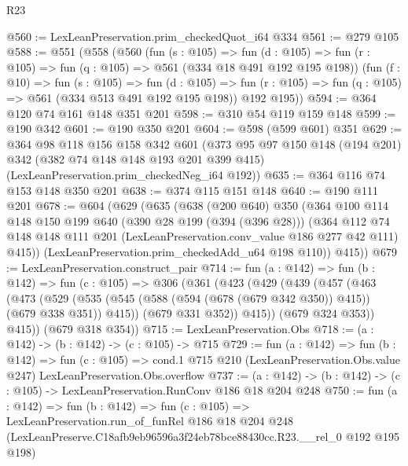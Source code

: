 \begin{lexlean}{R23}
\begin{coremodule}
@560 := LexLeanPreservation.prim_checkedQuot_i64 @334
@561 := @279 @105
@588 := @551
    (@558
      (@560
        (fun (s : @105) =>
        fun (d : @105) => fun (r : @105) => fun (q : @105) => @561 (@334 @18 @491 @192 @195 @198))
        (fun (f : @10) =>
        fun (s : @105) =>
        fun (d : @105) => fun (r : @105) => fun (q : @105) => @561 (@334 @513 @491 @192 @195 @198))
        @192
        @195))
@594 := @364 @120 @74 @161 @148 @351 @201
@598 := @310 @54 @119 @159 @148
@599 := @190 @342
@601 := @190 @350 @201
@604 := @598 (@599 @601) @351
@629 := @364
    @98
    @118
    @156
    @158
    @342
    @601
    (@373
      @95
      @97
      @150
      @148
      (@194 @201)
      @342
      (@382 @74 @148 @148 @193 @201 @399 @415)
      (LexLeanPreservation.prim_checkedNeg_i64 @192))
@635 := @364 @116 @74 @153 @148 @350 @201
@638 := @374 @115 @151 @148
@640 := @190 @111 @201
@678 := @604
    (@629
      (@635
        (@638
          (@200 @640)
          @350
          (@364
            @100
            @114
            @148
            @150
            @199
            @640
            (@390 @28 @199 (@394 (@396 @28)))
            (@364
              @112
              @74
              @148
              @148
              @111
              @201
              (LexLeanPreservation.conv_value @186 @277 @42 @111)
              @415))
          (LexLeanPreservation.prim_checkedAdd_u64 @198 @110))
        @415))
@679 := LexLeanPreservation.construct_pair
@714 := fun (a : @142) =>
  fun (b : @142) =>
  fun (c : @105) =>
  @306
    (@361
      (@423
        (@429
          (@439
            (@457
              (@463
                (@473
                  (@529
                    (@535 (@545 (@588 (@594 (@678 (@679 @342 @350)) @415)) (@679 @338 @351)) @415))
                  (@679 @331 @352))
                @415))
            (@679 @324 @353))
          @415))
      (@679 @318 @354))
@715 := LexLeanPreservation.Obs
@718 := (a : @142) -> (b : @142) -> (c : @105) -> @715
@729 := fun (a : @142) =>
  fun (b : @142) =>
  fun (c : @105) =>
  cond.{1} @715 @210 (LexLeanPreservation.Obs.value @247) LexLeanPreservation.Obs.overflow
@737 := (a : @142) -> (b : @142) -> (c : @105) -> LexLeanPreservation.RunConv @186 @18 @204 @248
@750 := fun (a : @142) =>
  fun (b : @142) =>
  fun (c : @105) =>
  LexLeanPreservation.run_of_funRel
    @186
    @18
    @204
    @248
    (LexLeanPreserve.C18afb9eb96596a3f24eb78bce88430cc.R23.__rel_0 @192 @195 @198)
\end{coremodule}
\end{lexlean}
